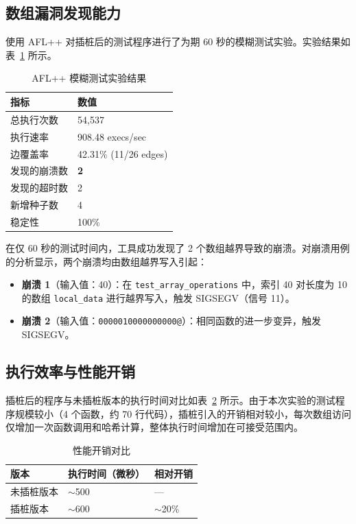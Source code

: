 \documentclass[bachelor]{njupthesis}
\begin{document}
\subsection{数组漏洞发现能力}

使用 AFL++ 对插桩后的测试程序进行了为期 60 秒的模糊测试实验。实验结果如表~\ref{tab:fuzz} 所示。

\begin{table}[hbt]
\centering
\caption{AFL++ 模糊测试实验结果}
\label{tab:fuzz}
\begin{tabular}{|l|l|}
\hline
\textbf{指标} & \textbf{数值} \\
\hline
总执行次数 & 54,537 \\
执行速率 & 908.48 execs/sec \\
边覆盖率 & 42.31\% (11/26 edges) \\
发现的崩溃数 & \textbf{2} \\
发现的超时数 & 2 \\
新增种子数 & 4 \\
稳定性 & 100\% \\
\hline
\end{tabular}
\end{table}

在仅 60 秒的测试时间内，工具成功发现了 2 个数组越界导致的崩溃。对崩溃用例的分析显示，两个崩溃均由数组越界写入引起：

\begin{itemize}
    \item \textbf{崩溃 1}（输入值：40）：在 \texttt{test\_array\_operations} 中，索引 40 对长度为 10 的数组 \texttt{local\_data} 进行越界写入，触发 SIGSEGV（信号 11）。
    \item \textbf{崩溃 2}（输入值：\texttt{0000010000000000@}）：相同函数的进一步变异，触发 SIGSEGV。
\end{itemize}

\subsection{执行效率与性能开销}

插桩后的程序与未插桩版本的执行时间对比如表~\ref{tab:perf} 所示。由于本次实验的测试程序规模较小（4 个函数，约 70 行代码），插桩引入的开销相对较小，每次数组访问仅增加一次函数调用和哈希计算，整体执行时间增加在可接受范围内。

\begin{table}[hbt]
\centering
\caption{性能开销对比}
\label{tab:perf}
\begin{tabular}{|l|l|l|}
\hline
\textbf{版本} & \textbf{执行时间（微秒）} & \textbf{相对开销} \\
\hline
未插桩版本 & $\sim$500 & --- \\
插桩版本 & $\sim$600 & $\sim$20\% \\
\hline
\end{tabular}
\end{table}
\end{document}
